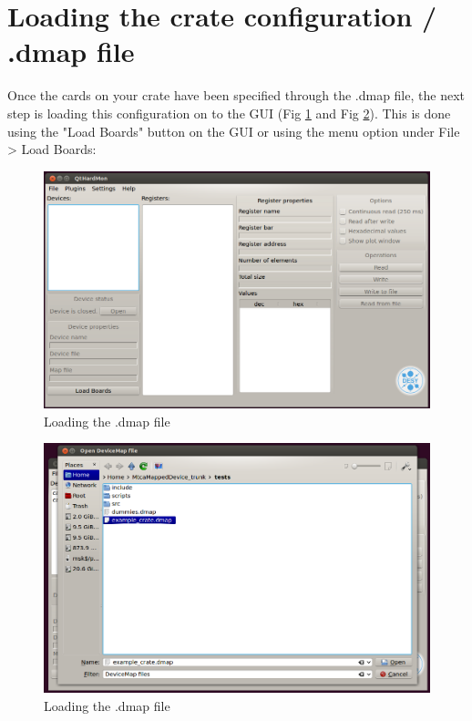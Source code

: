 \section{Loading the crate configuration / .dmap file}
Once the cards on your crate have been specified through the .dmap file, the next step is loading this configuration on to the GUI (Fig \ref{load_boards_button} and Fig \ref{load_boards_open_menu_to_load_dmap}). This is done using the "Load Boards" button on the GUI or using the menu option under File > Load Boards:

\begin{figure}[htbp]
\centering
\includegraphics[width=1\textwidth]{images/load_boards_1.png}
 \caption{Loading the .dmap file}
\label{load_boards_button}
\end{figure}

\begin{figure}[htbp]
\centering
\includegraphics[width=1\textwidth]{images/load_boards_2.png}
 \caption{Loading the .dmap file}
\label{load_boards_open_menu_to_load_dmap}
\end{figure}

